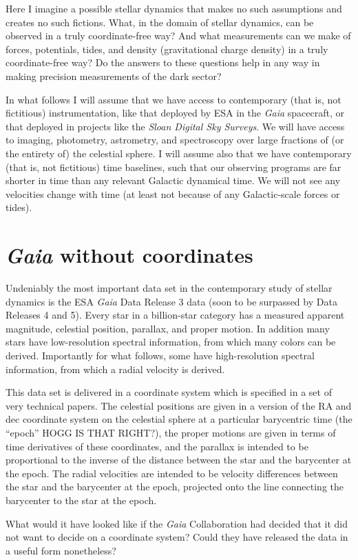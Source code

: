 \documentclass{article}
\begin{document}
Here I imagine a possible stellar dynamics that makes no such assumptions and creates no such fictions.
What, in the domain of stellar dynamics, can be observed in a truly coordinate-free way?
And what measurements can we make of forces, potentials, tides, and density (gravitational charge density) in a truly coordinate-free way?
Do the answers to these questions help in any way in making precision measurements of the dark sector?

In what follows I will assume that we have access to contemporary (that is, not fictitious) instrumentation, like that deployed by ESA in the \textsl{Gaia} spacecraft, or that deployed in projects like the \textsl{Sloan Digital Sky Surveys}.
We will have access to imaging, photometry, astrometry, and spectroscopy over large fractions of (or the entirety of) the celestial sphere.
I will assume also that we have contemporary (that is, not fictitious) time baselines, such that our observing programs are far shorter in time than any relevant Galactic dynamical time.
We will not see any velocities change with time (at least not because of any Galactic-scale forces or tides).

\section{\textsl{Gaia} without coordinates}
Undeniably the most important data set in the contemporary study of stellar dynamics is the ESA \textsl{Gaia} Data Release 3 data (soon to be surpassed by Data Releases 4 and 5).
Every star in a billion-star category has a measured apparent magnitude, celestial position, parallax, and proper motion.
In addition many stars have low-resolution spectral information, from which many colors can be derived.
Importantly for what follows, some have high-resolution spectral information, from which a radial velocity is derived.

This data set is delivered in a coordinate system which is specified in a set of very technical papers.
The celestial positions are given in a version of the RA and dec coordinate system on the celestial sphere at a particular barycentric time (the ``epoch'' HOGG IS THAT RIGHT?), the proper motions are given in terms of time derivatives of these coordinates, and the parallax is intended to be proportional to the inverse of the distance between the star and the barycenter at the epoch.
The radial velocities are intended to be velocity differences between the star and the barycenter at the epoch, projected onto the line connecting the barycenter to the star at the epoch.

What would it have looked like if the \textsl{Gaia} Collaboration had decided that it did not want to decide on a coordinate system?
Could they have released the data in a useful form nonetheless?
\end{document}
